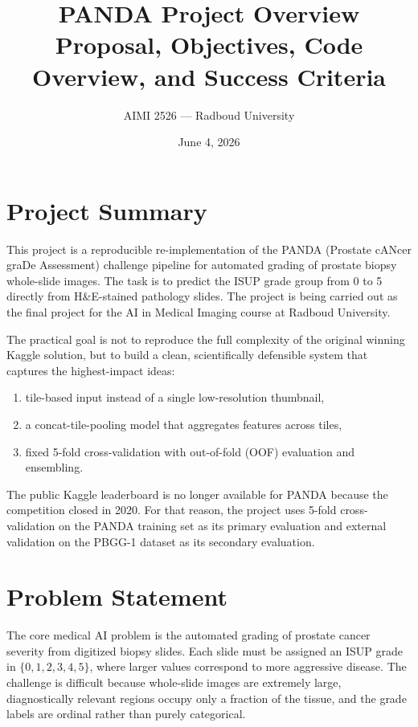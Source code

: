\documentclass[11pt]{article}
\title{PANDA Project Overview\\
\large Proposal, Objectives, Code Overview, and Success Criteria}
\author{AIMI 2526 --- Radboud University}
\date{June 4, 2026}
\begin{document}
\maketitle

\section{Project Summary}

This project is a reproducible re-implementation of the PANDA (Prostate cANcer graDe Assessment) challenge pipeline for automated grading of prostate biopsy whole-slide images. The task is to predict the ISUP grade group from 0 to 5 directly from H\&E-stained pathology slides. The project is being carried out as the final project for the AI in Medical Imaging course at Radboud University.

The practical goal is not to reproduce the full complexity of the original winning Kaggle solution, but to build a clean, scientifically defensible system that captures the highest-impact ideas:

\begin{enumerate}[leftmargin=*]
    \item tile-based input instead of a single low-resolution thumbnail,
    \item a concat-tile-pooling model that aggregates features across tiles,
    \item fixed 5-fold cross-validation with out-of-fold (OOF) evaluation and ensembling.
\end{enumerate}

The public Kaggle leaderboard is no longer available for PANDA because the competition closed in 2020. For that reason, the project uses 5-fold cross-validation on the PANDA training set as its primary evaluation and external validation on the PBGG-1 dataset as its secondary evaluation.

\section{Problem Statement}

The core medical AI problem is the automated grading of prostate cancer severity from digitized biopsy slides. Each slide must be assigned an ISUP grade in $\{0,1,2,3,4,5\}$, where larger values correspond to more aggressive disease. The challenge is difficult because whole-slide images are extremely large, diagnostically relevant regions occupy only a fraction of the tissue, and the grade labels are ordinal rather than purely categorical.
\end{document}

